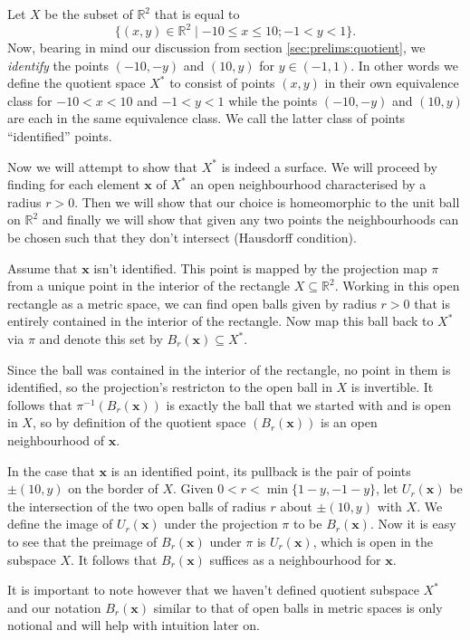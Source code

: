 \begin{exmp}
  \label{exmp:mobius}
  Let $X$ be the subset of $\mathbb{R}^2$ that is equal to
  \[
    \{ (x,y) \in \mathbb{R}^2 \mid -10 \leq x \leq 10 ; -1 < y < 1 \}.
  \]
  Now, bearing in mind our discussion from section
  \ref{sec:prelims:quotient}, we \emph{identify} the points $(-10,-y)$
  and $(10,y)$ for $y \in (-1,1)$. In other words we define the
  quotient space $X^*$ to consist of points $(x,y)$ in their own
  equivalence class for $-10 < x < 10$ and $-1 < y < 1$ while the
  points $(-10,-y)$ and $(10,y)$ are each in the same equivalence
  class. We call the latter class of points ``identified'' points.
  
  Now we will attempt to show that $X^*$ is indeed a surface. We will
  proceed by finding for each element $\mathbf{x}$ of $X^*$ an open
  neighbourhood characterised by a radius $r > 0$. Then we will show
  that our choice is homeomorphic to the unit ball on $\mathbb{R}^2$
  and finally we will show that given any two points the
  neighbourhoods can be chosen such that they don't intersect
  (Hausdorff condition).

  Assume that $\mathbf{x}$ isn't identified. This point is mapped by
  the projection map $\pi$ from a unique point in the interior of the
  rectangle $X \subseteq \mathbb{R}^2$. Working in this open rectangle
  as a metric space, we can find open balls given by radius $r >0$
  that is entirely contained in the interior of the rectangle. Now
  map this ball back to $X^*$ via $\pi$ and denote this set by
  $B_r(\mathbf{x}) \subseteq X^*$.
  
  Since the ball was contained in the interior of the rectangle, no
  point in them is identified, so the projection's restricton to the
  open ball in $X$ is invertible. It follows that $\pi^{-1}
  (B_r(\mathbf{x}))$ is exactly the ball that we started with and is
  open in $X$, so by definition of the quotient space
  $(B_r(\mathbf{x}))$ is an open neighbourhood of $\mathbf{x}$.

  In the case that $\mathbf{x}$ is an identified point, its pullback
  is the pair of points $\pm(10, y)$ on the border of $X$. Given $0 <
  r < \operatorname{min} \{ 1-y, -1-y \}$, let $U_r(\mathbf{x})$ be
  the intersection of the two open balls of radius $r$ about $\pm(10,
  y)$ with $X$. We define the image of $U_r(\mathbf{x})$ under the
  projection $\pi$ to be $B_r(\mathbf{x})$. Now it is easy to see that
  the preimage of $B_r(\mathbf{x})$ under $\pi$ is $U_r(\mathbf{x})$,
  which is open in the subspace $X$. It follows that $B_r(\mathbf{x})$
  suffices as a neighbourhood for $\mathbf{x}$.

  It is important to note however that we haven't defined quotient
  subspace $X^*$ and our notation $B_r(\mathbf{x})$ similar to that of
  open balls in metric spaces is only notional and will help with
  intuition later on.
\end{exmp}

